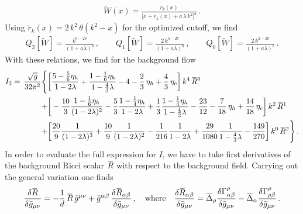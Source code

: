 \documentclass[11pt]{book}
\newcommand{\overbar}[1]{\mkern 1.5mu\overline{\mkern-1.5mu#1\mkern-1.5mu}\mkern 1.5mu}
\newcommand{\bR}{\overbar R}
\numberwithin{equation}{chapter}
\begin{document}
\begin{appendices}
\begin{align}
  \tilde W(x) = \frac{\dot r_k(x)}{ \big[ x+r_k(x)+a \, \lambda \, k^2 \big]^b} \,.
\end{align}
Using $\dot r_k(x) = 2 \, k^2 \, \theta(k^2-x)$ for the optimized cutoff, we find
\begin{align}
  Q_2[\tilde W] = \frac {k^{6-2b}}{(1 + a \lambda)^b} \,, \qquad
  Q_1[\tilde W] = \frac {2 \, k^{4-2b}}{(1 + a \lambda)^b} \,, \qquad
  Q_0[\tilde W] = \frac {2 \, k^{2-2b}}{(1 + a \lambda)^b} \,.
\end{align}
With these relations, we find for the background flow
\begin{align}
  I_3 = \, \frac{ \sqrt {\bar g} }{ 32 \pi^2 }
  \Bigg\lbrace
    &\bigg[
      \frac{5 - \frac{5}{6} \eta_h}{1 - 2 \lambda}
      + \frac{1 - \frac{1}{6} \eta_h}{1 - \frac 43 \lambda}
      - 4
      - \frac{2}{3} \, \eta_h
      + \frac{4}{3} \, \eta_c
    \bigg] \, k^4 \, \bR^0
    \notag \\
    + &\bigg[
      - \frac{10}{3} \frac{1 - \frac{1}{6} \eta_h}{(1 - 2 \lambda)^2}
      - \frac{5}{3} \frac{1 - \frac{1}{4} \eta_h}{1 - 2 \lambda}
      + \frac{1}{3} \frac{1 - \frac{1}{4} \eta_h}{1 - \frac 43 \lambda}
      - \frac{23}{12}
      - \frac{7}{18} \, \eta_h
      + \frac{14}{18} \, \eta_c
    \bigg] \, k^2 \, \bR^1
    \notag \\
    + &\bigg[
        \frac{20}{9} \frac{1}{(1 - 2 \lambda)^3}
      + \frac{10}{9} \frac{1}{(1 - 2 \lambda)^2}
      - \frac{1}{216} \frac{1}{1 - 2 \lambda}
      + \frac{29}{1080} \frac{1}{1 - \frac 43 \lambda}
      - \frac{149}{270}
    \bigg] \, k^0 \, \bR^2
  \Bigg\rbrace
    \,.
\end{align}
In order to evaluate the full expression for $I$,
we have to take first derivatives of the background Ricci
scalar $\bR$ with respect to the background field.
Carrying out the general variation one finds
\begin{align}
  \frac{\delta \bR}{\delta \bar g_{\mu\nu}}
  =
  - \frac 1d \, \bR \, \bar g^{\mu\nu}
  + \bar g^{\alpha\beta} \, \frac{\delta \bR_{\alpha\beta}}{\delta \bar g_{\mu\nu}} \,,
  \quad \text{where} \quad
  \frac{\delta \bR_{\alpha\beta}}{\delta \bar g_{\mu\nu}}
  =
  \overbar \Delta_\rho \frac{\delta \Gamma^\rho_{\alpha\beta}}{\delta \bar g_{\mu\nu}}
  - \overbar \Delta_\alpha \frac{\delta \Gamma^\rho_{\rho\beta}}{\delta  \bar g_{\mu\nu}} \,.

\end{align}
\end{appendices}
\end{document}
